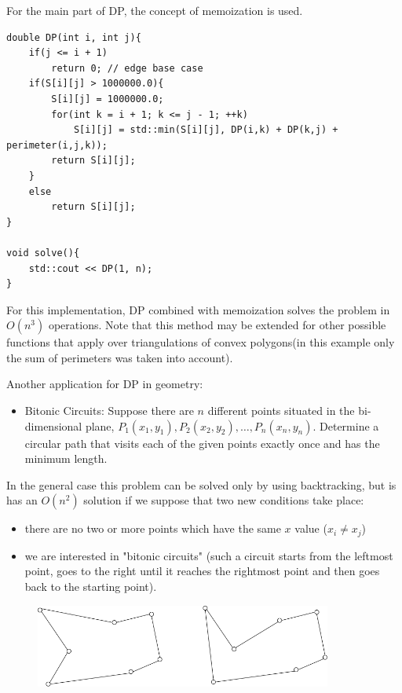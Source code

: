 \documentclass[letterpaper]{article}
\begin{document}
For the main part of DP, the concept of memoization is used.

\begin{lstlisting}
double DP(int i, int j){
    if(j <= i + 1)
        return 0; // edge base case
    if(S[i][j] > 1000000.0){
        S[i][j] = 1000000.0;
        for(int k = i + 1; k <= j - 1; ++k)
            S[i][j] = std::min(S[i][j], DP(i,k) + DP(k,j) + perimeter(i,j,k));
        return S[i][j];
    }
    else
        return S[i][j];
}

void solve(){
    std::cout << DP(1, n);
}

\end{lstlisting}

For this implementation, DP combined with memoization solves the problem in $O(n^{3})$ operations. Note that this method may be extended for other possible functions that apply over triangulations of convex polygons(in this example only the sum of perimeters was taken into account).

Another application for DP in geometry:

\begin{itemize}
    \item Bitonic Circuits: Suppose there are $n$ different points situated in the bi-dimensional plane, $P_{1}(x_1,y_1), P_{2}(x_2,y_2), \dots ,  P_{n}(x_n,y_n)$. Determine a circular path that visits each of the given points exactly once and has the minimum length.
\end{itemize}

In the general case this problem can be solved only by using backtracking, but is has an $O(n^2)$ solution if we suppose that two new conditions take place:

\begin{itemize}
    \item there are no two or more points which have the same $x$ value ($x_i \neq x_j$)
    \item we are interested in "bitonic circuits" (such a circuit starts from the leftmost point, goes to the right until it reaches the rightmost point and then goes back to the starting point). 
\end{itemize}

\begin{figure} [h!]
\centering
\includegraphics[width=0.87\textwidth]{pngOfDiagrams/bitonicCircuits.png}
\end{figure}
\end{document}

